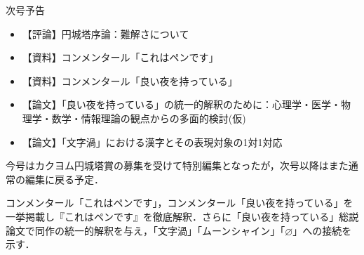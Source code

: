 \documentclass[10pt, a5paper, twoside]{jsarticle}
\theoremstyle{definition}
\begin{document}
	\begin{center}

		{\Large 次号予告}

			\vspace{10mm}

		\begin{itemize}

			\item 【評論】円城塔序論：難解さについて

				\vspace{3mm}

			\item 【資料】コンメンタール「これはペンです」

				\vspace{3mm}

			\item 【資料】コンメンタール「良い夜を持っている」

				\vspace{3mm}

			\item 【論文】「良い夜を持っている」の統一的解釈のために：心理学・医学・物理学・数学・情報理論の観点からの多面的検討(仮)

				\vspace{3mm}

			\item 【論文】「文字渦」における漢字とその表現対象の1対1対応
		
		\end{itemize}


	\end{center}

	\vspace{15mm}

	\begin{screen}
		
		今号はカクヨム円城塔賞の募集を受けて特別編集となったが，次号以降はまた通常の編集に戻る予定．

		コンメンタール「これはペンです」，コンメンタール「良い夜を持っている」を一挙掲載し『これはペンです』を徹底解釈．さらに「良い夜を持っている」総説論文で同作の統一的解釈を与え，「文字渦」「ムーンシャイン」「$\varnothing$」への接続を示す．

	\end{screen}

	\newpage
\end{document}
